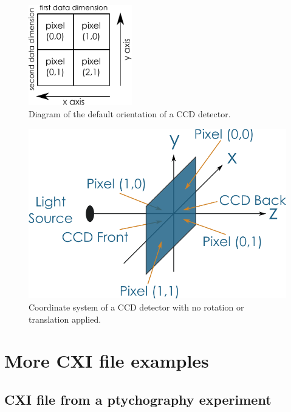 \documentclass[usletter,11pt]{article}
\begin{document}
\begin{figure}[h!]
\centering
\includegraphics[width=0.4\textwidth]{detector_orientation.pdf}
\caption{Diagram of the default orientation of a CCD detector.}
\label{fig:detector_orientation}
\end{figure}

\begin{figure}[h!]
\centering
\includegraphics[width=\textwidth]{detector_coord_system.png}
\caption{Coordinate system of a CCD detector with no rotation or
  translation applied.}
\label{fig:detector_coord_system}
\end{figure}

\clearpage
\appendix
\section{More CXI file examples}

\subsection{CXI file from a ptychography experiment}
\end{document}
